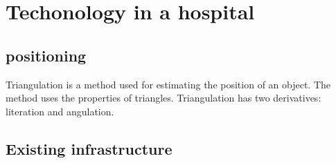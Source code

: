 
\section{Techonology in a hospital}


\subsection{positioning}
 
 Triangulation is a method used for estimating the position of an object. The method uses the properties of triangles. Triangulation has two derivatives: literation and angulation.

\subsection{Existing infrastructure} \label{sub:infra}
